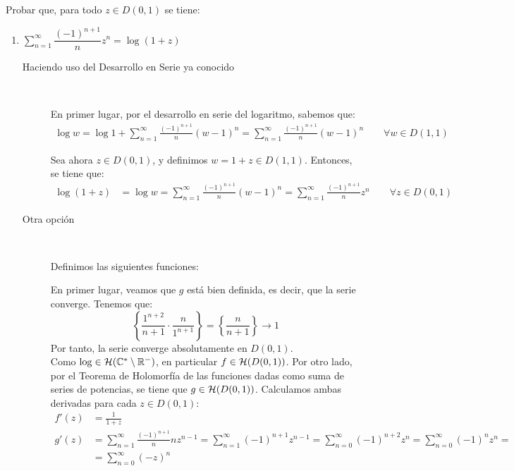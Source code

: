 \begin{ejercicio}\label{ej:serie_log_1masZ}
    Probar que, para todo $z \in D(0,1)$ se tiene:
    \begin{enumerate}
        \item $\sum\limits_{n= 1}^\infty \dfrac{(-1)^{n+1}}{n}z^n = \log(1+z)$
        
        \begin{description}
            \item[Haciendo uso del Desarrollo en Serie ya conocido]~
            
            En primer lugar, por el desarrollo en serie del logaritmo, sabemos que:
            \begin{align*}
                \log w = \log 1 + \sum_{n=1}^\infty \frac{(-1)^{n+1}}{n}\left(w - 1\right)^n = \sum_{n=1}^\infty \frac{(-1)^{n+1}}{n}\left(w - 1\right)^n\qquad \forall w\in D(1,1)
            \end{align*}

            Sea ahora $z\in D(0,1)$, y definimos $w = 1+z\in D(1,1)$. Entonces, se tiene que:
            \begin{align*}
                \log(1+z) &= \log w = \sum_{n=1}^\infty \frac{(-1)^{n+1}}{n}\left(w - 1\right)^n = \sum_{n=1}^\infty \frac{(-1)^{n+1}}{n}z^n\qquad \forall z\in D(0,1)
            \end{align*}

            \item[Otra opción]~
            
            Definimos las siguientes funciones:

            En primer lugar, veamos que $g$ está bien definida, es decir, que la serie converge. Tenemos que:
            \begin{equation*}
                \left\{\dfrac{1^{n+2}}{n+1}\cdot \dfrac{n}{1^{n+1}}\right\} = \left\{\dfrac{n}{n+1}\right\}\to 1
            \end{equation*}
            Por tanto, la serie converge absolutamente en $D(0,1)$.\\

            Como $\log\in \mathcal{H}(\mathbb{C}^*\setminus\mathbb{R}^-)$, en particular $f\in \mathcal{H}(D(0,1))$. Por otro lado, por el Teorema de Holomorfía de las funciones dadas como suma de series de potencias, se tiene que $g\in \mathcal{H}(D(0,1))$. Calculamos ambas derivadas para cada $z\in D(0,1)$:
            \begin{align*}
                f'(z) &= \frac{1}{1+z} \\
                g'(z) &= \sum_{n=1}^\infty \frac{(-1)^{n+1}}{n}nz^{n-1} = \sum_{n=1}^\infty (-1)^{n+1}z^{n-1} = \sum_{n=0}^\infty (-1)^{n+2}z^{n} = \sum_{n=0}^\infty (-1)^{n}z^{n}
                =\\&= \sum_{n=0}^\infty (-z)^{n}
            \end{align*}


\end{description}
\end{enumerate}
\end{ejercicio}

